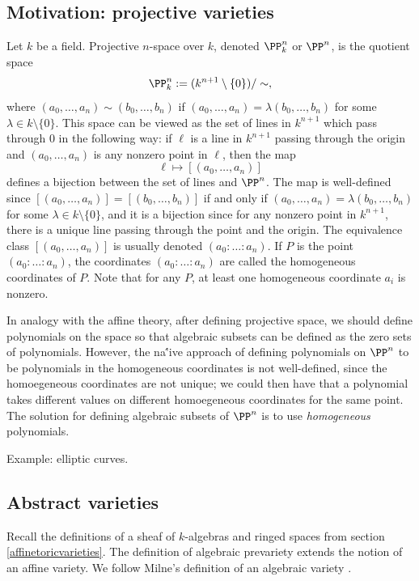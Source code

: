 \documentclass[12pt]{amsart}
\theoremstyle{plain}
\begin{document}
\subsection{Motivation: projective varieties}
Let $k$ be a field.
Projective $n$-space over $k$, denoted $\PP^n_k$ or $\PP^n$, is the quotient space
$$\PP^n_k := (k^{n+1} \setminus \{0\}) / \sim,$$
where $(a_0, \ldots, a_{n}) \sim (b_0, \ldots, b_{n})$ if $(a_0, \ldots, a_n) = \lambda (b_0, \ldots, b_n)$ for some $\lambda \in k \setminus \{0\}$.
This space can be viewed as the set of lines in $k^{n+1}$ which pass through $0$ in the following way:
if $\ell$ is a line in $k^{n+1}$ passing through the origin and $(a_0, \ldots, a_n)$ is any nonzero point in $\ell$, then the map
$$\ell \mapsto [(a_0, \ldots, a_n)]$$
defines a bijection between the set of lines and $\PP^n$.
The map is well-defined since $[(a_0, \ldots, a_n)] = [(b_0, \ldots, b_n)]$ if and only if $(a_0, \ldots, a_n) = \lambda (b_0, \ldots, b_n)$ for some $\lambda \in k \setminus \{0\}$, and it is a bijection since for any nonzero point in $k^{n+1}$, there is a unique line passing through the point and the origin.
The equivalence class $[(a_0, \ldots, a_n)]$ is usually denoted $(a_0 : \ldots : a_n)$.
If $P$ is the point $(a_0 : \ldots : a_n)$, the coordinates $(a_0 : \ldots : a_n)$ are called the homogeneous coordinates of $P$. 
Note that for any $P$, at least one homogeneous coordinate $a_i$ is nonzero.

In analogy with the affine theory, after defining projective space, we should define polynomials on the space so that algebraic subsets can be defined as the zero sets of polynomials.
However, the na\''ive approach of defining polynomials on $\PP^n$ to be polynomials in the homogeneous coordinates is not well-defined, since the homoegeneous coordinates are not unique;
we could then have that a polynomial takes different values on different homoegeneous coordinates for the same point.
The solution for defining algebraic subsets of $\PP^n$ is to use \emph{homogeneous} polynomials.

Example: elliptic curves.

\subsection{Abstract varieties}
Recall the definitions of a sheaf of $k$-algebras and ringed spaces from section \ref{affinetoricvarieties}.
The definition of algebraic prevariety extends the notion of an affine variety.
We follow Milne's definition of an algebraic variety \cite{Milne13}.
\end{document}
